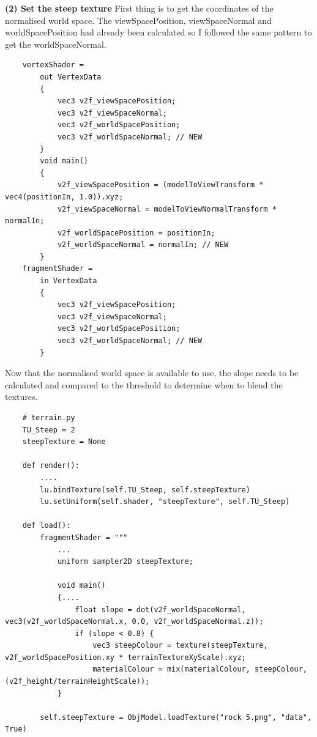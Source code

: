 \documentclass[a4 paper, 12pt]{article}
\begin{document}
\textbf{(2) Set the steep texture}
First thing is to get the coordinates of the normalised world space. The viewSpacePosition, viewSpaceNormal and worldSpacePosition had already been calculated so I followed the same pattern to get the worldSpaceNormal.

    \begin{lstlisting}
    vertexShader =
        out VertexData
        {
            vec3 v2f_viewSpacePosition;
            vec3 v2f_viewSpaceNormal;
            vec3 v2f_worldSpacePosition;
            vec3 v2f_worldSpaceNormal; // NEW
        }
        void main()
        {
            v2f_viewSpacePosition = (modelToViewTransform * vec4(positionIn, 1.0)).xyz;
            v2f_viewSpaceNormal = modelToViewNormalTransform * normalIn;
            v2f_worldSpacePosition = positionIn;
            v2f_worldSpaceNormal = normalIn; // NEW
        }
    fragmentShader = 
        in VertexData
        {
            vec3 v2f_viewSpacePosition;
            vec3 v2f_viewSpaceNormal;
            vec3 v2f_worldSpacePosition;
            vec3 v2f_worldSpaceNormal; // NEW
        }
    \end{lstlisting}

    Now that the normalised world space is available to use, the slope needs to be calculated and compared to the threshold to determine when to blend the textures.

    \begin{lstlisting}
    # terrain.py
    TU_Steep = 2
    steepTexture = None

    def render():
        ....
        lu.bindTexture(self.TU_Steep, self.steepTexture)
        lu.setUniform(self.shader, "steepTexture", self.TU_Steep)

    def load():
        fragmentShader = """
            ...
            uniform sampler2D steepTexture;

            void main()
            {....
                float slope = dot(v2f_worldSpaceNormal, vec3(v2f_worldSpaceNormal.x, 0.0, v2f_worldSpaceNormal.z));
                if (slope < 0.8) {
                    vec3 steepColour = texture(steepTexture, v2f_worldSpacePosition.xy * terrainTextureXyScale).xyz;
                    materialColour = mix(materialColour, steepColour, (v2f_height/terrainHeightScale));
            } 

        self.steepTexture = ObjModel.loadTexture("rock 5.png", "data", True)
    \end{lstlisting}
\end{document}
